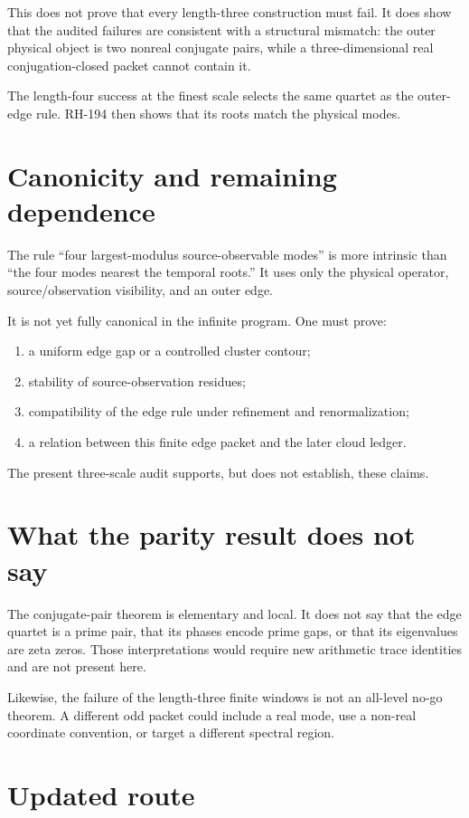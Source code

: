 \documentclass[12pt]{article}
\theoremstyle{remark}
\begin{document}
This does not prove that every length-three construction must fail.  It does
show that the audited failures are consistent with a structural mismatch:
the outer physical object is two nonreal conjugate pairs, while a
three-dimensional real conjugation-closed packet cannot contain it.

The length-four success at the finest scale selects the same quartet as the
outer-edge rule.  RH-194 then shows that its roots match the physical modes.

\section{Canonicity and remaining dependence}

The rule “four largest-modulus source-observable modes” is more intrinsic than
“the four modes nearest the temporal roots.”  It uses only the physical
operator, source/observation visibility, and an outer edge.

It is not yet fully canonical in the infinite program.  One must prove:
\begin{enumerate}[leftmargin=2em]
\item a uniform edge gap or a controlled cluster contour;
\item stability of source-observation residues;
\item compatibility of the edge rule under refinement and renormalization;
\item a relation between this finite edge packet and the later cloud ledger.
\end{enumerate}
The present three-scale audit supports, but does not establish, these claims.

\section{What the parity result does not say}

The conjugate-pair theorem is elementary and local.  It does not say that
the edge quartet is a prime pair, that its phases encode prime gaps, or that
its eigenvalues are zeta zeros.  Those interpretations would require new
arithmetic trace identities and are not present here.

Likewise, the failure of the length-three finite windows is not an all-level
no-go theorem.  A different odd packet could include a real mode, use a
non-real coordinate convention, or target a different spectral region.

\section{Updated route}
\end{document}
